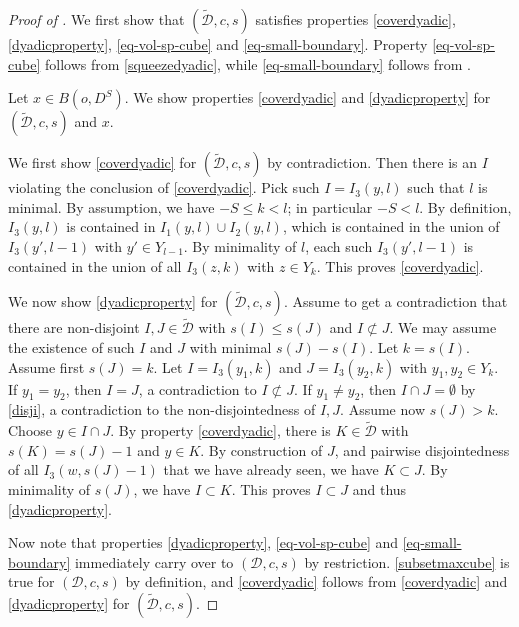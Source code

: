 \documentclass[10pt,a4paper]{article}
\theoremstyle{plain}
\theoremstyle{definition}
\numberwithin{equation}{subsection}
\newcommand{\proves}[1]{}
\newcommand{\leanok}{}
\begin{document}
\begin{proof}[Proof of ]
\proves{grid-existence}
\leanok
We first show that $(\tilde{\mathcal{D}},c,s)$ satisfies properties \eqref{coverdyadic}, \eqref{dyadicproperty}, \eqref{eq-vol-sp-cube} and \eqref{eq-small-boundary}. Property \eqref{eq-vol-sp-cube}
follows from \eqref{squeezedyadic}, while \eqref{eq-small-boundary} follows from .

Let $x\in B(o, D^S)$.
We show properties
\eqref{coverdyadic} and
\eqref{dyadicproperty}
for $(\tilde{\mathcal{D}},c,s)$ and $x$.

We first show \eqref{coverdyadic} for $(\tilde{\mathcal{D}},c,s)$ by contradiction. Then there is an $I$ violating the conclusion of
\eqref{coverdyadic}. Pick such $I=I_3(y,l)$ such that $l$ is minimal.
{By assumption, we have $-S\le k<l$; in particular $-S<l$}.
By definition, $I_3(y, l)$ is contained in $I_1(y, l)\cup I_2(y, l)$, which is contained in the union of $I_3(y',l-1)$ with $y'\in Y_{l-1}$.
By minimality of $l$, each such $I_3(y',l-1)$ is contained in the union of
all $I_3(z,k)$ with $z\in Y_k$. This proves \eqref{coverdyadic}.

We now show \eqref{dyadicproperty} for $(\tilde{\mathcal{D}},c,s)$. Assume to get a contradiction that
there are non-disjoint $I, J\in \tilde{\mathcal{D}}$ with $s(I)\le s(J)$
and $I \not \subset J$. We may assume the existence of such $I$ and $J$ with minimal
$s(J)-s(I)$. Let $k=s(I)$. Assume first $s(J)=k$. Let $I=I_3(y_1,k)$ and $J=I_3(y_2,k)$ with $y_1,y_2\in Y_k$.
If $y_1=y_2$, then $I=J$, a contradiction to $I\not \subset J$.
If $y_1\neq y_2$, then $I\cap J=\emptyset$ by \eqref{disji}, a contradiction to the non-disjointedness of $I,J$.
Assume now $s(J)>k$. Choose $y\in I\cap J$. By property \eqref{coverdyadic},
there is $K\in \tilde{\mathcal{D}}$ with $s(K)=s(J)-1$ and $y\in K$. By construction
of $J$, and pairwise disjointedness of all $I_3(w,s(J)-1)$ that we have already seen,
we have $K\subset J$. By minimality of $s(J)$, we have $I\subset K$.
This proves $I\subset J$ and thus \eqref{dyadicproperty}.

Now note that properties \eqref{dyadicproperty}, \eqref{eq-vol-sp-cube} and \eqref{eq-small-boundary} immediately carry over to $(\mathcal{D},c, s)$ by restriction. \eqref{subsetmaxcube} is true for $(\mathcal{D}, c, s)$ by definition, and \eqref{coverdyadic} follows from \eqref{coverdyadic} and \eqref{dyadicproperty} for $(\tilde{\mathcal{D}}, c, s)$.
\end{proof}
\end{document}
